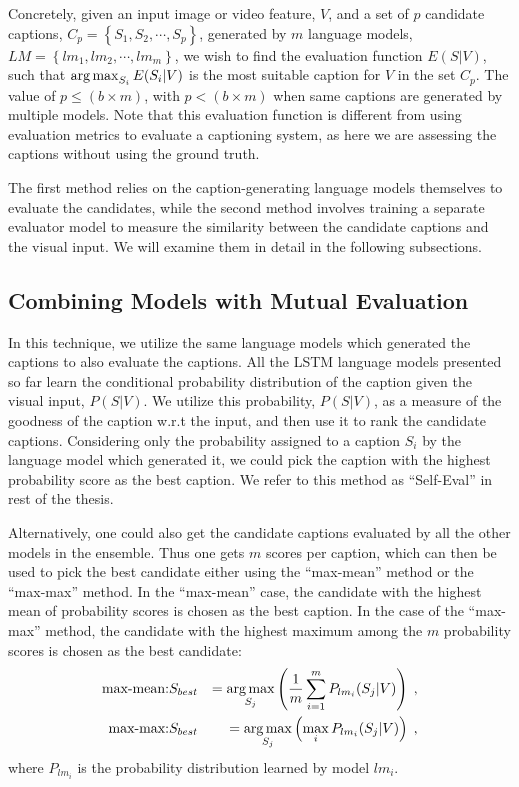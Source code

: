 Concretely, given an input image or video feature, $V$, and a set of $p$
candidate captions, $C_p = \left\{S_1,S_2,\cdots, S_p\right\}$, generated by $m$
language models, $LM = \left\{lm_1,lm_2,\cdots, lm_m\right\}$, we wish to find
the evaluation function $E(S|V)$, such that $\operatorname*{arg\,max}_{S_i} E(S_i|V)$ is
the most suitable caption for $V$ in the set $C_p$.
The value of $p \leq (b\times m)$, with $p<(b\times m)$ when same captions are
generated by multiple models.
Note that this evaluation function is different from using evaluation metrics to
evaluate a captioning system, as here we are assessing the captions without
using the ground truth. 

The first method relies on the caption-generating language models themselves to
evaluate the candidates, while the second method involves training a separate
evaluator model to measure the similarity between the candidate captions and the
visual input.
We will examine them in detail in the following subsections.

\subsection{Combining Models with Mutual Evaluation}
\label{subsec:MutEval}

In this technique, we utilize the same language models which generated the
captions to also evaluate the captions.
All the LSTM language models presented so far learn the conditional probability
distribution of the caption given the visual input, $P(S|V)$.
We utilize this probability, $P(S|V)$, as a measure of the goodness of the
caption w.r.t the input, and then use it to rank the candidate captions.
Considering only the probability assigned to a caption $S_i$ by the language
model which generated it, we could pick the caption with the highest probability
score as the best caption.
We refer to this method as ``Self-Eval'' in rest of the thesis. 

Alternatively, one could also get the candidate captions evaluated by all the
other models in the ensemble.
Thus one gets $m$ scores per caption, which can then be used to pick the best
candidate either using the ``max-mean'' method or the ``max-max'' method.
In the ``max-mean'' case, the candidate with the highest mean of probability
scores is chosen as the best caption.
In the case of the ``max-max'' method, the candidate with the highest maximum among
the $m$ probability scores is chosen as the best candidate:
\begin{eqnarray}
  \label{eq:cmme} 
  \text{max-mean:}& S_{best} &= \operatorname*{arg\,max}_{S_j}\left(\frac{1}{m}\sum_{i=1}^{m}
  P_{lm_i}(S_j | V)\right) \; ,\\
  \text{max-max:}& S_{best} &= \operatorname*{arg\,max}_{S_j} \left(\max_i P_{lm_i}(S_j |
  V)\right) \; ,
\end{eqnarray}
\noindent where $P_{lm_i}$ is the probability distribution learned by model
$lm_i$.

